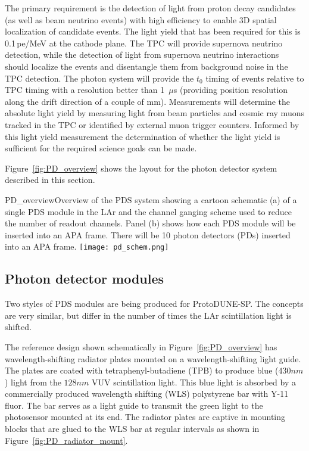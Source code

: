 The primary requirement is the detection of light from proton decay
candidates (as well as beam neutrino events) with high efficiency to
enable 3D spatial localization of candidate events. The light yield that
has been required for this is 0.1\,pe/MeV at the cathode plane.
The TPC will provide supernova neutrino detection, while the detection of light
from supernova neutrino interactions should localize the events and disentangle
them from background noise in the TPC detection.
The photon system will provide the $t_0$ timing of
events relative to TPC timing with a resolution better than 1~$\mu$s
(providing position resolution along the drift direction of a couple of mm). 
Measurements %
will determine the absolute
light yield by measuring light from beam particles and cosmic ray muons
tracked in the TPC or identified by external muon trigger counters.
Informed by this light yield measurement the determination of whether the 
light yield is sufficient for the required science goals can be made.

Figure~\ref{fig:PD_overview} shows the layout for the photon detector
system described in this section. %

\begin{cdrfigure}{PD_overview}{Overview of the PDS
    system showing a cartoon schematic (a) of a single PDS module
    in the LAr and the channel ganging scheme used to reduce the
    number of readout channels. Panel (b) shows how each PDS module
    will be inserted into an APA frame. There will be 10 photon detectors (PDs) inserted
    into an APA frame.}
\texttt{[image: pd\_schem.png]}
\end{cdrfigure}

\subsection{Photon detector modules}

Two styles of PDS %
modules are being produced for ProtoDUNE-SP.  
The concepts are very similar, but differ in the number of times the LAr scintillation 
light is shifted.  

The reference design shown schematically in Figure~\ref{fig:PD_overview}
has wavelength-shifting radiator plates mounted on a wavelength-shifting light guide.
The plates are coated 
with tetraphenyl-butadiene (TPB) to produce blue ($430nm$) light from the $128nm$ VUV 
scintillation light.  
This blue light is absorbed by a commercially produced wavelength shifting (WLS)
polystyrene bar with Y-11 fluor.  
The bar serves as a light guide to transmit the green light to the photosensor 
mounted at its end.
The radiator plates are captive in mounting blocks that are glued to the WLS bar
at regular intervals as shown in Figure~\ref{fig:PD_radiator_mount}.

